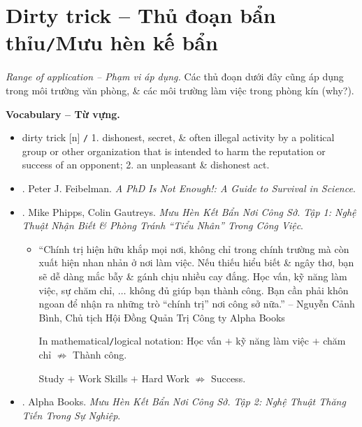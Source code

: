 \documentclass[12pt,oneside]{book}
\begin{document}
\section{Dirty trick -- Thủ đoạn bẩn thỉu{\tt/}Mưu hèn kế bẩn}
\label{subsect: dirty tricks}
{\it Range of application -- Phạm vi áp dụng.} Các thủ đoạn dưới đây cũng áp dụng trong môi trường văn phòng, \& các môi trường làm việc trong phòng kín (why?).

\noindent\textbf{\textsf{\small Vocabulary -- Từ vựng.}}
\begin{itemize}\small
	\item {\sf dirty trick} [n] {\tt/} 1. dishonest, secret, \& often illegal activity by a political group or other organization that is intended to harm the reputation or success of an opponent; 2. an unpleasant \& dishonest act.
\end{itemize}

\begin{itemize}
	\item \cite{Feibelman2011}. {\sc Peter J. Feibelman}. {\it A PhD Is Not Enough!: A Guide to Survival in Science}.
	\item \cite{Phipps_Gautreys_muu_hen_ke_ban_tap_1}. {\sc Mike Phipps, Colin Gautreys}. {\it Mưu Hèn Kết Bẩn Nơi Công Sở. Tập 1: Nghệ Thuật Nhận Biết \& Phòng Tránh ``Tiểu Nhân'' Trong Công Việc}.
	\begin{itemize}
		\item ``Chính trị hiện hữu khắp mọi nơi, không chỉ trong chính trường mà còn xuất hiện nhan nhản ở nơi làm việc. Nếu thiếu hiểu biết \& ngây thơ, bạn sẽ dễ dàng mắc bẫy \& gánh chịu nhiều cay đắng. Học vấn, kỹ năng làm việc, sự chăm chỉ, $\ldots$ không đủ giúp bạn thành công. Bạn cần phải khôn ngoan để nhận ra những trò ``chính trị'' nơi công sở nữa.'' -- {\sc Nguyễn Cảnh Bình}, Chủ tịch Hội Đồng Quản Trị Công ty Alpha Books
		
		{\sf In mathematical{\tt/}logical notation}: Học vấn $+$ kỹ năng làm việc $+$ chăm chỉ $\not\Rightarrow$ Thành công.
		\begin{center}
			Study $+$ Work Skills $+$ Hard Work $\not\Rightarrow$ Success.
		\end{center}
		
	\end{itemize}
	\item \cite{muu_hen_ke_ban_tap_2}. Alpha Books. {\it Mưu Hèn Kết Bẩn Nơi Công Sở. Tập 2: Nghệ Thuật Thăng Tiến Trong Sự Nghiệp}.
\end{itemize}
\end{document}
